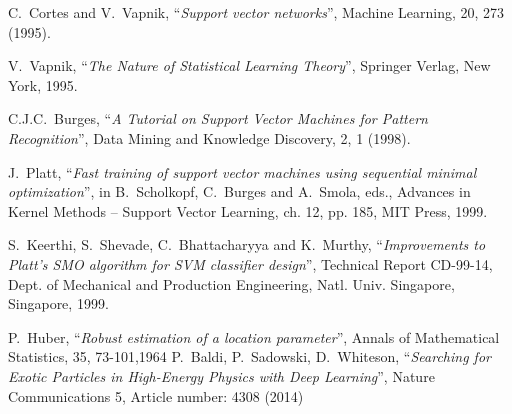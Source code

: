 \begin{thebibliography}{99}
  C.~Cortes and V.~Vapnik, 
                       ``{\em Support vector networks}'', 
                       Machine Learning, 20, 273 (1995). 

  V.~Vapnik, ``{\em The Nature of Statistical Learning Theory}'', 
                       Springer Verlag, New York, 1995.

       C.J.C.~Burges, 
                       ``{\em A Tutorial on Support Vector Machines for Pattern Recognition}'', 
                       Data Mining and Knowledge Discovery, 2, 1 (1998).

        J.~Platt,
                       ``{\em Fast training of support vector machines using sequential 
                       minimal optimization}'', 
                       in B.~Scholkopf, C.~Burges and A.~Smola, eds., 
                       Advances in Kernel Methods -- Support Vector Learning, 
                       ch. 12, pp. 185, MIT Press, 1999.

      S.~Keerthi, S.~Shevade, C.~Bhattacharyya and K.~Murthy, 
                       ``{\em Improvements to Platt's SMO algorithm for SVM classifier 
                       design}'', 
                       Technical Report CD-99-14, Dept. of Mechanical and Production Engineering, 
                       Natl. Univ. Singapore, Singapore, 1999.

	      P.~Huber,
		      ``{\em Robust estimation of a location parameter}'',
		      Annals of Mathematical Statistics, 35, 73-101,1964
   P.~Baldi, P.~Sadowski, D.~Whiteson,
                      ``{\em Searching for Exotic Particles in High-Energy Physics 
                         with Deep Learning}'', Nature Communications 5,
                      Article number: 4308 (2014)

\end{thebibliography}
